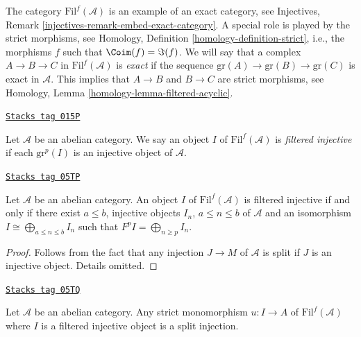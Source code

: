 \medskip\noindent
The category $\text{Fil}^f(\mathcal{A})$ is an example of an
exact category, see
Injectives, Remark \ref{injectives-remark-embed-exact-category}.
A special role is played by the strict morphisms, see
Homology, Definition \ref{homology-definition-strict},
i.e., the morphisms $f$ such that $\Coim(f) = \Im(f)$.
We will say that a complex $A \to B \to C$ in $\text{Fil}^f(\mathcal{A})$ is
{\it exact} if the sequence $\text{gr}(A) \to \text{gr}(B) \to \text{gr}(C)$
is exact in $\mathcal{A}$. This implies that $A \to B$ and $B \to C$
are strict morphisms, see
Homology, Lemma \ref{homology-lemma-filtered-acyclic}.

\begin{definition}
\label{derived-definition-filtered-complexes-notation}
\href{https://stacks.math.columbia.edu/tag/015P}{\texttt{Stacks tag 015P}}

Let $\mathcal{A}$ be an abelian category.
We say an object $I$ of $\text{Fil}^f(\mathcal{A})$
is {\it filtered injective} if each $\text{gr}^p(I)$ is
an injective object of $\mathcal{A}$.
\end{definition}

\begin{lemma}
\label{derived-lemma-filtered-injective}
\href{https://stacks.math.columbia.edu/tag/05TP}{\texttt{Stacks tag 05TP}}

Let $\mathcal{A}$ be an abelian category.
An object $I$ of $\text{Fil}^f(\mathcal{A})$ is filtered injective
if and only if
there exist $a \leq b$, injective objects $I_n$, $a \leq n \leq b$
of $\mathcal{A}$ and an isomorphism $I \cong \bigoplus_{a \leq n \leq b} I_n$
such that $F^pI = \bigoplus_{n \geq p} I_n$.
\end{lemma}

\begin{proof}
Follows from the fact that any injection $J \to M$ of $\mathcal{A}$
is split if $J$ is an injective object. Details omitted.
\end{proof}

\begin{lemma}
\label{derived-lemma-split-strict-monomorphism}
\href{https://stacks.math.columbia.edu/tag/05TQ}{\texttt{Stacks tag 05TQ}}

Let $\mathcal{A}$ be an abelian category.
Any strict monomorphism $u : I \to A$ of $\text{Fil}^f(\mathcal{A})$
where $I$ is a filtered injective object is a split injection.
\end{lemma}

